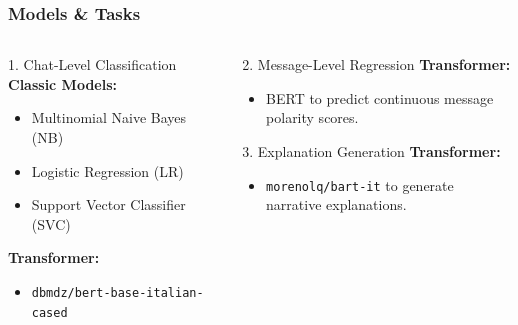 \documentclass[aspectratio=169]{beamer}
\begin{document}
\begin{frame}
  \frametitle{Models \& Tasks}
  
  \begin{columns}
    \begin{column}{0.5\textwidth}
      \begin{block}{1. Chat-Level Classification}
        \textbf{Classic Models:}
        \begin{itemize}
          \item Multinomial Naive Bayes (NB)
          \item Logistic Regression (LR)
          \item Support Vector Classifier (SVC)
        \end{itemize}
        \textbf{Transformer:}
        \begin{itemize}
          \item \texttt{dbmdz/bert-base-italian-cased}
        \end{itemize}
      \end{block}
    \end{column}
    \begin{column}{0.5\textwidth}
      \begin{block}{2. Message-Level Regression}
        \textbf{Transformer:}
        \begin{itemize}
          \item BERT to predict continuous message polarity scores.
        \end{itemize}
      \end{block}
      \begin{block}{3. Explanation Generation}
        \textbf{Transformer:}
        \begin{itemize}
          \item \texttt{morenolq/bart-it} to generate narrative explanations.
        \end{itemize}
      \end{block}
    \end{column}
  \end{columns}
\end{frame}
\end{document}
